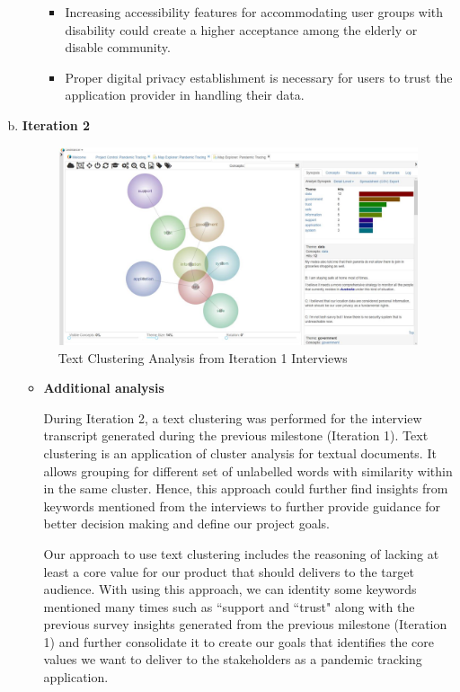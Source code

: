 \begin{enumerate}[a)]
\begin{itemize}
\begin{itemize}
                \item Increasing accessibility features for accommodating user groups with disability could create a higher acceptance among the elderly or disable community.
                \item Proper digital privacy establishment is necessary for users to trust the application provider in handling their data.
              \end{itemize}
          \end{itemize}
        \item \textbf{Iteration 2}
          \begin{figure}[H]
            \centering
            \includegraphics[width=\textwidth]{img/prototype/lexi.png}
            \caption{Text Clustering Analysis from Iteration 1 Interviews}
            \label{fig:findings-2}
          \end{figure}
          \begin{itemize}
            \item \textbf{Additional analysis}
              \par During Iteration 2, a text clustering was performed for the interview transcript generated during the previous milestone (Iteration 1). Text clustering is an application of cluster analysis for textual documents. It allows grouping for different set of unlabelled words with similarity within in the same cluster. Hence, this approach could further find insights from keywords mentioned from the interviews to further provide guidance for better decision making and define our project goals.
              \par Our approach to use text clustering includes the reasoning of lacking at least a core value for our product that should delivers to the target audience. With using this approach, we can identity some keywords mentioned many times such as ``support and ``trust" along with the previous survey insights generated from the previous milestone (Iteration 1) and further consolidate it to create our goals that identifies the core values we want to deliver to the stakeholders as a pandemic tracking application.

\end{itemize}
\end{enumerate}
